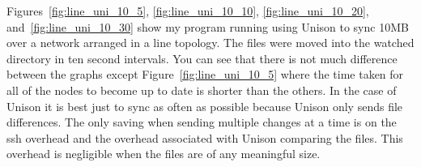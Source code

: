 \documentclass[12pt]{article}
\begin{document}

Figures~\ref{fig:line_uni_10_5},
\ref{fig:line_uni_10_10}, \ref{fig:line_uni_10_20},
and~\ref{fig:line_uni_10_30} show my program running
using Unison to sync 10MB over a network arranged in
a line topology. The files were moved into the watched
directory in ten second intervals. You can see that there is not much
difference between the graphs except Figure~\ref{fig:line_uni_10_5} 
where the time taken for all of the nodes to become up to date
is shorter than the others. In the case of Unison it
is best just to sync as often as possible because Unison
only sends file differences. The only saving when sending
multiple changes at a time is on the ssh overhead
and the overhead associated with Unison comparing the
files. This overhead is negligible when the files
are of any meaningful size.
\end{document}
